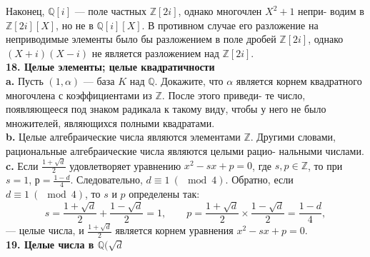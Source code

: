 Наконец, $\mathbb{Q}[i]$ --- поле частных $\mathbb{Z}[2i]$, однако многочлен $X^2+1$ непри-\linebreak
водим в $\mathbb{Z}[2i][X]$, но не в $\mathbb{Q}[i][X]$. В противном случае его разложение\linebreak
на неприводимые элементы было бы разложением в поле дробей $\mathbb{Z}[2i]$,\linebreak
однако $(X+i)(X-i)$ не является разложением над $\mathbb{Z}[2i]$.\newline
\\
\noindent\textbf{18. Целые элементы; целые квадратичности} \newline 
\\
\hspace*{15pt}\textbf{a.} Пусть $(1,\alpha)$ --- база $K$ над $\mathbb{Q}$. Докажите, что $\alpha$ является корнем\linebreak
квадратного многочлена с коэффициентами из $\mathbb{Z}$. После этого приведи-\linebreak
те число, появляющееся под знаком радикала к такому виду, чтобы у\linebreak
него не было множителей, являющихся полными квадратами.\newline
\\
\hspace*{15pt}\textbf{b.} Целые алгебраические числа являются элементами $\mathbb{Z}$. Другими\linebreak
словами, рациональные алгебраические числа являются целыми рацио-\linebreak
нальными числами.\newline
\\
\hspace*{15pt}\textbf{c.} Если $\frac{1+\sqrt{d}}{2}$ удовлетворяет уравнению $x^2-sx+p=0$, где $s,p\in\mathbb{Z}$,\linebreak
то при $s=1$, $р=\frac{1-d}{4}$. Следовательно, $d\equiv1~(\mod{4})$. Обратно, если\linebreak
$d\equiv1~(\mod{4})$, то $s$ и $p$ определены так:
$$s=\frac{1+\sqrt{d}}{2}+\frac{1-\sqrt{d}}{2}=1,\qquad p=\frac{1+\sqrt{d}}{2}\times\frac{1-\sqrt{d}}{2}=\frac{1-d}{4},$$
\newpage
%
%
\noindent--- целые числа, и $\frac{1+\sqrt{d}}{2}$ является корнем уравнения $x^2-sx+p=0$.\linebreak
\\
\noindent\textbf{19. Целые числа в $\mathbb{Q}(\sqrt{d}$} \newline 

